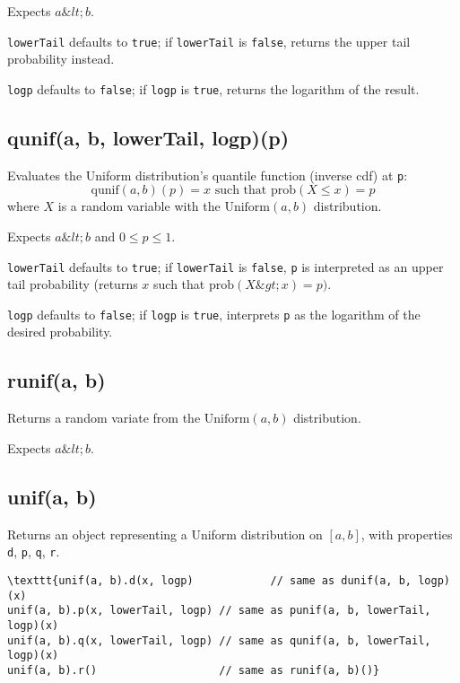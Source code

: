 \documentclass{article}
\begin{document}
Expects $a \&lt; b$.


\texttt{lowerTail} defaults to \texttt{true}; if \texttt{lowerTail} is \texttt{false}, returns
the upper tail probability instead.


\texttt{logp} defaults to \texttt{false}; if \texttt{logp} is \texttt{true}, returns the logarithm
of the result.


    \subsection*{qunif(a, b, lowerTail, logp)(p)}
    Evaluates the Uniform distribution's quantile function
(inverse cdf) at \texttt{p}:
$$\textrm{qunif}(a, b)(p) = x \textrm{ such that } \textrm{prob}(X \leq x) = p$$
where $X$ is a random variable with the $\textrm{Uniform}(a, b)$ distribution.


Expects $a \&lt; b$ and $0 \leq p \leq 1$.


\texttt{lowerTail} defaults to \texttt{true}; if \texttt{lowerTail} is \texttt{false}, \texttt{p} is
interpreted as an upper tail probability (returns
$x$ such that $\textrm{prob}(X \&gt; x) = p)$.


\texttt{logp} defaults to \texttt{false}; if \texttt{logp} is \texttt{true}, interprets \texttt{p} as
the logarithm of the desired probability.


    \subsection*{runif(a, b)}
    Returns a random variate from the $\textrm{Uniform}(a,b)$ distribution.


Expects $a\&lt;b$.


    \subsection*{unif(a, b)}
    Returns an object representing a Uniform distribution on $[a, b]$,
with properties \texttt{d}, \texttt{p}, \texttt{q}, \texttt{r}.


\begin{lstlisting}
\texttt{unif(a, b).d(x, logp)            // same as dunif(a, b, logp)(x)
unif(a, b).p(x, lowerTail, logp) // same as punif(a, b, lowerTail, logp)(x)
unif(a, b).q(x, lowerTail, logp) // same as qunif(a, b, lowerTail, logp)(x)
unif(a, b).r()                   // same as runif(a, b)()}\end{lstlisting}
\end{document}

